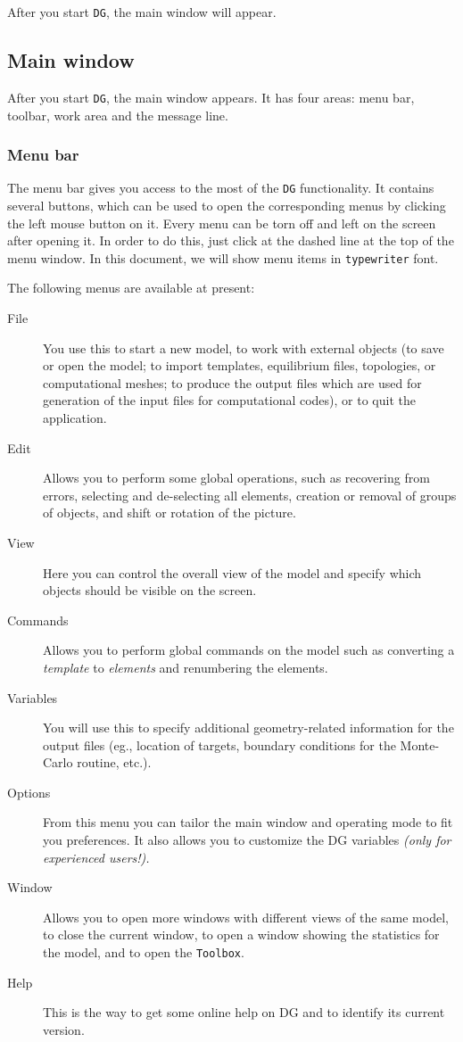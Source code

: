 \documentclass[a4paper,10pt]{report}
\begin{document}
After you start {\tt DG}, the main window will appear.

\subsection{Main window}

After you start {\tt DG}, the main window appears. It has four areas: menu bar, toolbar, work area and the message line.

\subsubsection{Menu bar}

The menu bar gives you access to the most of the {\tt DG} functionality. It
contains several buttons, which can be used to open the corresponding
menus by clicking the left mouse button on it. Every menu can be torn
off and left on the screen after opening it. In order to do
this, just click at the dashed line at the top of the menu window. In this document,
we will show menu items in {\tt typewriter} font.

The following menus are available at present:

\begin{description}
  \item[File] You use this to start a new model, to work with
external objects (to save or open the model; to import templates,
equilibrium files, topologies,
or computational meshes; to produce the output files
which are used for generation of the input files for computational
codes), or to quit the application.
  \item[Edit] Allows you to perform some global operations,
such as recovering from errors, selecting and de-selecting all
elements, creation or removal of groups of objects, and shift or
rotation of the picture.
  \item[View] Here you can control the overall view of the
model and specify which objects should be
visible on the screen.
  \item[Commands] Allows you to perform global commands on
the model such as converting
a {\it template} to {\it elements} and
renumbering the elements.
  \item[Variables] You will use this to specify
additional geometry-related information for the output files (eg.,
location of targets, boundary conditions for the Monte-Carlo routine,
etc.).
  \item[Options] From this menu you can tailor the main window
and operating mode
to fit you preferences. It also allows you to customize the DG
variables {\it (only for experienced users!).}
  \item[Window] Allows you to open more windows with
different views of the same model, to close the current window, to open
a window showing the statistics for the model, and to open the
{\tt Toolbox}.
  \item[Help] This is the way to get some online help on DG and
to identify its current version.
\end{description}
\end{document}
